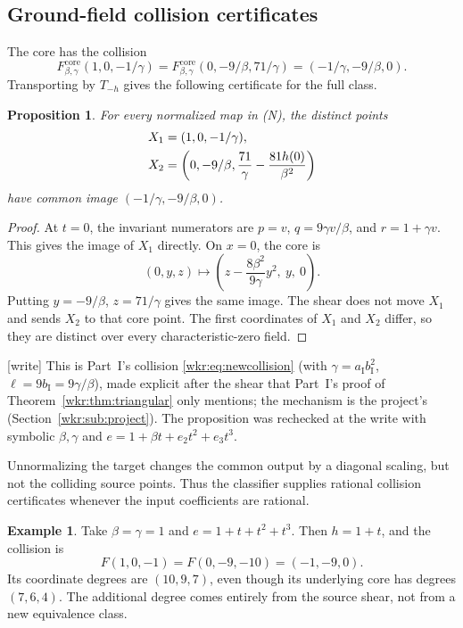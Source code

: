 \documentclass[11pt,a4paper]{article}
\numberwithin{equation}{section}
\newtheorem{proposition}[theorem]{Proposition}
\theoremstyle{definition}
\newtheorem{example}[theorem]{Example}
\theoremstyle{remark}
\begin{document}
\subsection{Ground-field collision certificates}

The core has the collision
\[
F_{\beta,\gamma}^{\mathrm{core}}(1,0,-1/\gamma)
=F_{\beta,\gamma}^{\mathrm{core}}(0,-9/\beta,71/\gamma)
=(-1/\gamma,-9/\beta,0).
\]
Transporting by $T_{-h}$ gives the following certificate for the full
class.

\begin{proposition}\label{wkr:as:prop:collision}
For every normalized map in (N), the distinct points
\begin{align}
X_1&=(1,0,-1/\gamma),\notag\\
X_2&=\left(0,-9/\beta,\frac{71}{\gamma}-\frac{81h(0)}{\beta^2}\right)
\label{wkr:as:eq:collision}
\end{align}
have common image $(-1/\gamma,-9/\beta,0)$.
\end{proposition}
\begin{proof}
At $t=0$, the invariant numerators are $p=v$, $q=9\gamma v/\beta$,
and $r=1+\gamma v$. This gives the image of $X_1$ directly. On $x=0$, the
core is
\[
(0,y,z)\longmapsto
\left(z-\frac{8\beta^2}{9\gamma}y^2,\ y,\ 0\right).
\]
Putting $y=-9/\beta$, $z=71/\gamma$ gives the same image. The shear does
not move $X_1$ and sends $X_2$ to that core point. The first coordinates
of $X_1$ and $X_2$ differ, so they are distinct over every
characteristic-zero field.
\end{proof}
\noindent\textup{[write]} This is Part~I's collision
\eqref{wkr:eq:newcollision} (with $\gamma=a_{\mathrm I}b_{\mathrm I}^2$,
$\ell=9b_{\mathrm I}=9\gamma/\beta$), made explicit after the shear that
Part~I's proof of Theorem~\ref{wkr:thm:triangular} only mentions; the
mechanism is the project's (Section~\ref{wkr:sub:project}). The
proposition was rechecked at the write with symbolic $\beta,\gamma$ and
$e=1+\beta t+e_2t^2+e_3t^3$.

Unnormalizing the target changes the common output by a diagonal scaling,
but not the colliding source points. Thus the classifier supplies rational
collision certificates whenever the input coefficients are rational.

\begin{example}\label{wkr:as:ex:shear}
Take $\beta=\gamma=1$ and $e=1+t+t^2+t^3$. Then $h=1+t$, and the
collision is
\[
F(1,0,-1)=F(0,-9,-10)=(-1,-9,0).
\]
Its coordinate degrees are $(10,9,7)$, even though its underlying core has
degrees $(7,6,4)$. The additional degree comes entirely from the source
shear, not from a new equivalence class.
\end{example}
\end{document}
